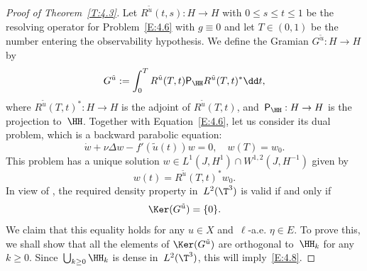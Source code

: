 \begin{proof}[Proof of Theorem~\ref{T:4.3}]
Let $R^{\tilde u}(t,s):H\to H$ with $0\le s\le t\le 1$ be the resolving operator for Problem~\eqref{E:4.6} with $g\equiv0$ and let $T\in(0,1)$ be the number entering the observability hypothesis. We define the Gramian $G^{\tilde u}:H\to H$ by\vspace*{-3pt}
\begin{equation} \label{E:4.7}
G^{\tilde u}:=\int_0^T R^{\tilde u}(T,t){\mathsf P}_\HH R^{\tilde u}(T,t)^*\dd t,
\end{equation}
where $R^{\tilde u}(T,t)^*:H\to H$ is the adjoint of $R^{\tilde u}(T,t)$, and~${\mathsf P}_\HH: H\to H$ is the projection to~$\HH$. Together with Equation~\eqref{E:4.6}, let us consider its dual problem, which is a backward parabolic equation:\vspace*{-3pt}
\begin{equation} \label{E:4.9}
\dot w+\nu \Delta w-f'(\tilde u(t)) w=0, \quad w(T)=w_0.
\end{equation}
This problem has a unique solution $w\in L^1(J,H^1)\cap W^{1,2}(J,H^{-1})$ given by\vspace*{-3pt}
\begin{equation} \label{E:4.10}
w(t)=R^{\tilde u}(T,t)^*w_0.
\end{equation}
In view of \cite[Part\,IV, Th.\,2.5]{zabczyk2008}, the required density property in~$L^2(\T^3)$ is valid if and only if\vspace*{-3pt}
\begin{equation}\label{E:4.8}
\Ker(G^{\tilde u})=\{0\}.
\end{equation}
We claim that this equality holds for any $u\in X$ and~$\ell$-a.e. $\eta\in E$. To prove this, we shall show that all the elements of $ \Ker(G^{\tilde u})$ are orthogonal to~$\HH_k$ for any~$k\ge0$. Since~$\bigcup_{k\ge0}\HH_k$ is dense in~$L^2(\T^3)$, this will imply~\eqref{E:4.8}.


\end{proof}
